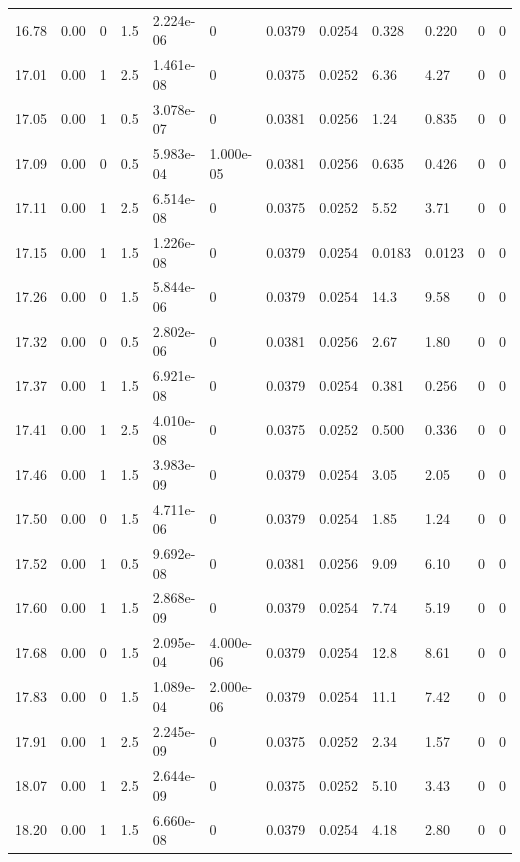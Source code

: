 \documentclass[preview]{standalone}
\begin{document}
{{{{{{\begin{tabular}{L{1.2cm}C{1.2cm} C{0.3cm}C{0.5cm} C{1.4cm}C{1.4cm} C{1.4cm}C{1.4cm} C{1.6cm}C{1.6cm} C{1.6cm}C{1.6cm}}
  16.78  &  0.00  & 0     & 1.5 &  2.224e-06  & 0  &  0.0379&   0.0254& 0.328 & 0.220   &  0 & 0  \\ 
  17.01  &  0.00  & 1     & 2.5 &  1.461e-08  & 0  &  0.0375&   0.0252& 6.36 & 4.27   &  0 & 0  \\ 
  17.05  &  0.00  & 1     & 0.5 &  3.078e-07  & 0  &  0.0381&   0.0256& 1.24 & 0.835   &  0 & 0  \\ 
  17.09  &  0.00  & 0     & 0.5 &  5.983e-04  & 1.000e-05  &  0.0381&   0.0256& 0.635 & 0.426   &  0 & 0  \\ 
  17.11  &  0.00  & 1     & 2.5 &  6.514e-08  & 0  &  0.0375&   0.0252& 5.52 & 3.71   &  0 & 0  \\ 
  17.15  &  0.00  & 1     & 1.5 &  1.226e-08  & 0  &  0.0379&   0.0254& 0.0183 & 0.0123   &  0 & 0  \\ 
  17.26  &  0.00  & 0     & 1.5 &  5.844e-06  & 0  &  0.0379&   0.0254& 14.3 & 9.58   &  0 & 0  \\ 
  17.32  &  0.00  & 0     & 0.5 &  2.802e-06  & 0  &  0.0381&   0.0256& 2.67 & 1.80   &  0 & 0  \\ 
  17.37  &  0.00  & 1     & 1.5 &  6.921e-08  & 0  &  0.0379&   0.0254& 0.381 & 0.256   &  0 & 0  \\ 
  17.41  &  0.00  & 1     & 2.5 &  4.010e-08  & 0  &  0.0375&   0.0252& 0.500 & 0.336   &  0 & 0  \\ 
  17.46  &  0.00  & 1     & 1.5 &  3.983e-09  & 0  &  0.0379&   0.0254& 3.05 & 2.05   &  0 & 0  \\ 
  17.50  &  0.00  & 0     & 1.5 &  4.711e-06  & 0  &  0.0379&   0.0254& 1.85 & 1.24   &  0 & 0  \\ 
  17.52  &  0.00  & 1     & 0.5 &  9.692e-08  & 0  &  0.0381&   0.0256& 9.09 & 6.10   &  0 & 0  \\ 
  17.60  &  0.00  & 1     & 1.5 &  2.868e-09  & 0  &  0.0379&   0.0254& 7.74 & 5.19   &  0 & 0  \\ 
  17.68  &  0.00  & 0     & 1.5 &  2.095e-04  & 4.000e-06  &  0.0379&   0.0254& 12.8 & 8.61   &  0 & 0  \\ 
  17.83  &  0.00  & 0     & 1.5 &  1.089e-04  & 2.000e-06  &  0.0379&   0.0254& 11.1 & 7.42   &  0 & 0  \\ 
  17.91  &  0.00  & 1     & 2.5 &  2.245e-09  & 0  &  0.0375&   0.0252& 2.34 & 1.57   &  0 & 0  \\ 
  18.07  &  0.00  & 1     & 2.5 &  2.644e-09  & 0  &  0.0375&   0.0252& 5.10 & 3.43   &  0 & 0  \\ 
  18.20  &  0.00  & 1     & 1.5 &  6.660e-08  & 0  &  0.0379&   0.0254& 4.18 & 2.80   &  0 & 0  \\ 

\end{tabular}}}}}}}
\end{document}
